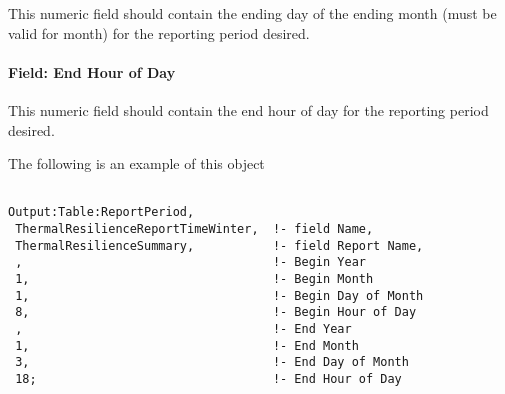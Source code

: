 This numeric field should contain the ending day of the ending month (must be
valid for month) for the reporting period desired.

\paragraph{Field: End Hour of Day}\label{field-end-hour-of-day}

This numeric field should contain the end hour of day for the reporting period
desired.

The following is an example of this object

\begin{lstlisting}

Output:Table:ReportPeriod,
 ThermalResilienceReportTimeWinter,  !- field Name,
 ThermalResilienceSummary,           !- field Report Name,
 ,                                   !- Begin Year
 1,                                  !- Begin Month
 1,                                  !- Begin Day of Month
 8,                                  !- Begin Hour of Day
 ,                                   !- End Year
 1,                                  !- End Month
 3,                                  !- End Day of Month
 18;                                 !- End Hour of Day

\end{lstlisting}
